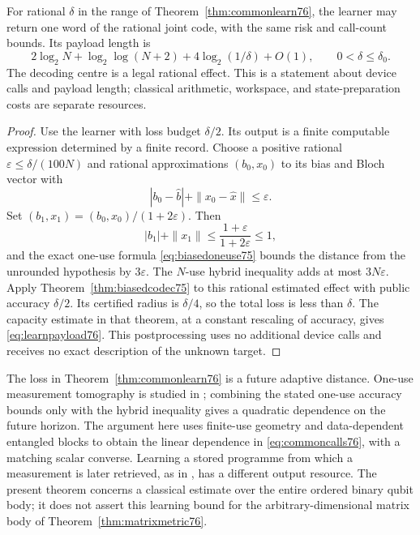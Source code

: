\begin{corollary}
\label{cor:learncode76}
For rational $\delta$ in the range of
Theorem~\ref{thm:commonlearn76}, the learner may return one word of
the rational joint code, with the same risk and call-count bounds.
Its payload length is
\begin{equation}\label{eq:learnpayload76}
 2\log_2N+\log_2\log(N+2)
             +4\log_2(1/\delta)+O(1),
 \qquad 0<\delta\le\delta_0.
\end{equation}
The decoding centre is a legal rational effect.  This is a statement
about device calls and payload length; classical arithmetic,
workspace, and state-preparation costs are separate resources.
\end{corollary}
\begin{proof}
Use the learner with loss budget $\delta/2$.  Its output is a finite
computable expression determined by a finite record.  Choose a
positive rational $\varepsilon\le\delta/(100N)$ and rational
approximations $(b_0,x_0)$ to its bias and Bloch vector with
\[
 |b_0-\widehat b|+\|x_0-\widehat x\|\le\varepsilon.
\]
Set $(b_1,x_1)=(b_0,x_0)/(1+2\varepsilon)$.  Then
\[
 |b_1|+\|x_1\|
       \le\frac{1+\varepsilon}{1+2\varepsilon}\le1,
\]
and the exact one-use formula \eqref{eq:biasedoneuse75} bounds the
distance from the unrounded hypothesis by $3\varepsilon$.
The $N$-use hybrid inequality adds at most $3N\varepsilon$.
Apply Theorem~\ref{thm:biasedcodec75} to this rational estimated
effect with public accuracy $\delta/2$.  Its certified radius is
$\delta/4$, so the total loss is less than $\delta$.
The capacity estimate in that theorem, at a constant rescaling of
accuracy, gives \eqref{eq:learnpayload76}.  This postprocessing uses
no additional device calls and receives no exact description of the
unknown target.
\end{proof}

The loss in Theorem~\ref{thm:commonlearn76} is a future adaptive
distance.  One-use measurement tomography is studied in
\cite{MB67,ZRK76}; combining the stated one-use accuracy bounds
only with the hybrid inequality gives a quadratic dependence on
the future horizon.  The argument here uses finite-use geometry
and data-dependent entangled blocks to obtain the linear dependence
in \eqref{eq:commoncalls76}, with a matching scalar converse.
Learning a stored programme from which a measurement is later
retrieved, as in \cite{BDPS76}, has a different output resource.
The present theorem concerns a classical estimate over the entire
ordered binary qubit body; it does not assert this learning bound
for the arbitrary-dimensional matrix body of
Theorem~\ref{thm:matrixmetric76}.
